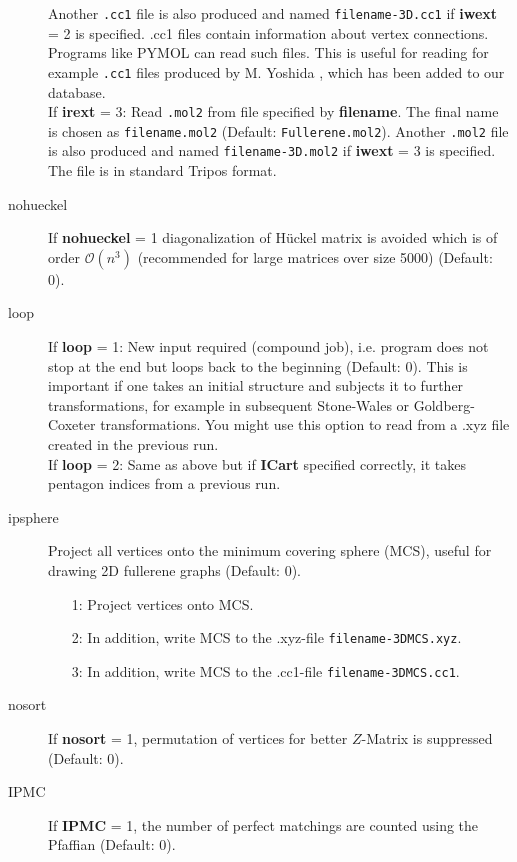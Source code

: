 \documentclass[article,a4paper,twoside]{memoir}
\newcommand{\filename}[1]{\texttt{#1}}
\newcommand{\paramname}[1]{{\color{green}\textbf{#1}}}
\begin{document}
\begin{description}
  Another \filename{.cc1} file is also produced and named \filename{filename-3D.cc1} if \paramname{iwext} = 2 is specified.
  .cc1 files contain information about vertex connections. Programs like PYMOL can read such files. This is useful for reading for example \filename{.cc1} files produced 
  by M. Yoshida \cite{Yoshida}, which has been added to our database.\\
  If \paramname{irext} = 3: Read \filename{.mol2} from file specified by \paramname{filename}. The final name is chosen as \filename{filename.mol2} (Default: \filename{Fullerene.mol2}). 
  Another \filename{.mol2} file is also produced and named \filename{filename-3D.mol2} if \paramname{iwext} = 3 is specified.
  The file is in standard Tripos format.\\
\item[{nohueckel}]  If \paramname{nohueckel} = 1 diagonalization of H\"uckel matrix is avoided which is of order $\mathcal{O}(n^3)$ (recommended for large matrices over size 5000) (Default: 0).
\item[{loop}] 
  If \paramname{loop} = 1: New input required (compound job), i.e. program does not stop at the end but loops back to the beginning (Default: 0). 
  This is important if one takes an initial structure and subjects it to further transformations, for example in subsequent Stone-Wales or
  Goldberg-Coxeter transformations. You might use this option to read from a .xyz file created in the previous run.\\
  If \paramname{loop} = 2: Same as above but if \paramname{ICart} specified correctly, it takes pentagon indices from a previous run.
\item[{ipsphere}] 
  Project all vertices onto the minimum covering sphere (MCS), useful for drawing 2D fullerene graphs (Default: 0).
  \begin{enumerate}
  \item[1:] Project vertices onto MCS.
  \item[2:] In addition, write MCS to the .xyz-file \filename{filename-3DMCS.xyz}.
  \item[3:] In addition, write MCS to the .cc1-file \filename{filename-3DMCS.cc1}.
  \end{enumerate}
\item[{nosort}] If \paramname{nosort} = 1, permutation of vertices for better $Z$-Matrix is suppressed (Default: 0).
\item[{IPMC}] If \paramname{IPMC} = 1, the number of perfect matchings are counted using the Pfaffian (Default: 0).

\end{description}
\end{document}
